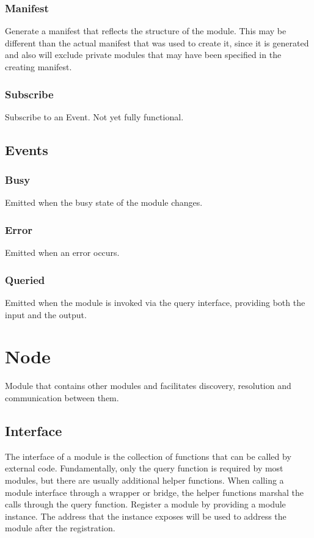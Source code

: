 \documentclass{article}
\begin{document}
\subsubsection{Manifest}
Generate a manifest that reflects the structure of the module.  This may be different than the actual manifest that was used to create it, since it is generated and also will exclude private modules that may have been specified in the creating manifest.
\subsubsection{Subscribe}
Subscribe to an Event. Not yet fully functional.

\subsection{Events}
\subsubsection{Busy}
Emitted when the busy state of the module changes.
\subsubsection{Error}
Emitted when an error occurs.
\subsubsection{Queried}
Emitted when the module is invoked via the query interface, providing both the input and the output.

\section{Node}
Module that contains other modules and facilitates discovery, resolution and communication between them.
\subsection{Interface}
The interface of a module is the collection of functions that can be called by external code.  Fundamentally, only the query function is required by most modules, but there are usually additional helper functions.  When calling a module interface through a wrapper or bridge, the helper functions marshal the calls through the query function.
Register a module by providing a module instance.  The address that the instance exposes will be used to address the module after the registration.
\end{document}
